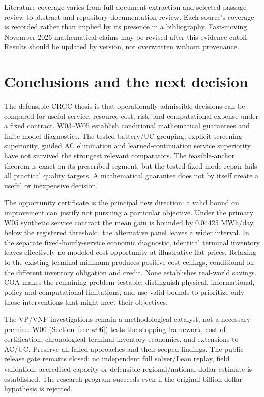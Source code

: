 \documentclass[11pt,letterpaper]{article}
\begin{document}
Literature coverage varies from full-document extraction and selected passage review to abstract and repository documentation review. Each source's coverage is recorded rather than implied by its presence in a bibliography. Fast-moving November 2026 mathematical claims may be revised after this evidence cutoff. Results should be updated by version, not overwritten without provenance.

\section{Conclusions and the next decision}
The defensible CRGC thesis is that operationally admissible decisions can be compared for useful service, resource cost, risk, and computational expense under a fixed contract. W03--W05 establish conditional mathematical guarantees and finite-model diagnostics. The tested battery/UC grouping, explicit screening superiority, guided AC elimination and learned-continuation service superiority have not survived the strongest relevant comparators. The feasible-anchor theorem is exact on its prescribed segment, but the tested fixed-mode repair fails all practical quality targets. A mathematical guarantee does not by itself create a useful or inexpensive decision.

The opportunity certificate is the principal new direction: a valid bound on improvement can justify not pursuing a particular objective. Under the primary W05 synthetic service contract the mean gain is bounded by 0.04425 MWh/day, below the registered threshold; the alternative panel leaves a wider interval. In the separate fixed-hourly-service economic diagnostic, identical terminal inventory leaves effectively no modeled cost opportunity at illustrative flat prices. Relaxing to the existing terminal minimum produces positive cost ceilings, conditional on the different inventory obligation and credit. None establishes real-world savings. COA makes the remaining problem testable: distinguish physical, informational, policy and computational limitations, and use valid bounds to prioritize only those interventions that might meet their objectives.

The VP/VNP investigations remain a methodological catalyst, not a necessary premise. W06 (Section~\ref{sec:w06}) tests the stopping framework, cost of certification, chronological terminal-inventory economics, and extensions to AC/UC. Preserve all failed approaches and their scoped findings. The public release gate remains closed: no independent full solver/Lean replay, field validation, accredited capacity or defensible regional/national dollar estimate is established. The research program succeeds even if the original billion-dollar hypothesis is rejected.
\end{document}
